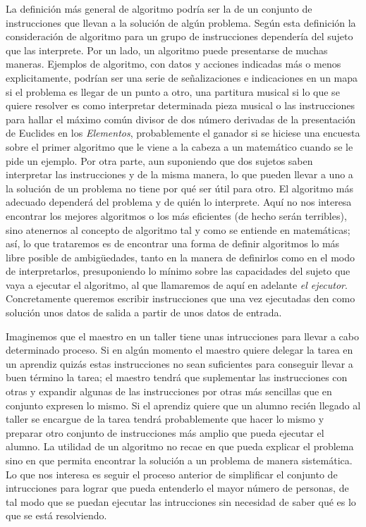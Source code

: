 La definición más general de algoritmo podría ser la de un conjunto de instrucciones que llevan a la
solución de algún problema. Según esta definición la consideración de algoritmo para un grupo de
instrucciones dependería del sujeto que las interprete. Por un lado, un algoritmo puede presentarse
de muchas maneras. Ejemplos de algoritmo, con datos y acciones indicadas más o menos explicitamente,
podrían ser una serie de señalizaciones e indicaciones en un mapa si el problema es llegar de un
punto a otro, una partitura musical si lo que se quiere resolver es como interpretar determinada
pieza musical o las instrucciones para hallar el máximo común divisor de dos número derivadas de la
presentación de Euclides en los {\it Elementos}, probablemente el ganador si se hiciese una encuesta
sobre el primer algoritmo que le viene a la cabeza a un matemático cuando se le pide un ejemplo. Por
otra parte, aun suponiendo que dos sujetos saben interpretar las instrucciones y de la misma manera,
lo que pueden llevar a uno a la solución de un problema no tiene por qué ser útil para otro. El
algoritmo más adecuado dependerá del problema y de quién lo interprete.  Aquí no nos interesa
encontrar los mejores algoritmos o los más eficientes (de hecho serán terribles), sino atenernos al
concepto de algoritmo tal y como se entiende en matemáticas; así, lo que trataremos es de encontrar
una forma de definir algoritmos lo más libre posible de ambigüedades, tanto en la manera de
definirlos como en el modo de interpretarlos, presuponiendo lo mínimo sobre las capacidades del
sujeto que vaya a ejecutar el algoritmo, al que llamaremos de aquí en adelante {\it el
ejecutor}. Concretamente queremos escribir instrucciones que una vez ejecutadas den como solución
unos datos de salida a partir de unos datos de entrada.

Imaginemos que el maestro en un taller tiene unas intrucciones para llevar a cabo determinado
proceso. Si en algún momento el maestro quiere delegar la tarea en un aprendiz quizás estas
instrucciones no sean suficientes para conseguir llevar a buen término la tarea; el maestro tendrá
que suplementar las instrucciones con otras y expandir algunas de las instrucciones por otras más
sencillas que en conjunto expresen lo mismo. Si el aprendiz quiere que un alumno recién llegado al
taller se encargue de la tarea tendrá probablemente que hacer lo mismo y preparar otro conjunto de
instrucciones más amplio que pueda ejecutar el alumno. La utilidad de un algoritmo no recae en que
pueda explicar el problema sino en que permita encontrar la solución a un problema de manera
sistemática. Lo que nos interesa es seguir el proceso anterior de simplificar el conjunto de
intrucciones para lograr que pueda entenderlo el mayor número de personas, de tal modo que se puedan
ejecutar las intrucciones sin necesidad de saber qué es lo que se está resolviendo.

